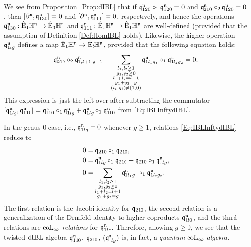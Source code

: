 \documentclass[\MainFolder/Text.tex]{subfiles}
\begin{document}
\begin{Remark}\label{Rem:Higher}
\begin{RemarkList}
\item We see from Proposition~\ref{Prop:dIBL} that if $\mathfrak{q}_{120}^{\mathfrak{n}} \circ_1 \mathfrak{q}_{120}^{\mathfrak{n}} = 0$ and $\mathfrak{q}_{210}^{\mathfrak{n}} \circ_{2} \mathfrak{q}_{120}^{\mathfrak{n}} = 0$, then $[\partial^{\mathfrak{n}}, \mathfrak{q}_{130}^{\mathfrak{n}}] = 0$ and $[\partial^{\mathfrak{n}}, \mathfrak{q}_{111}^{\mathfrak{n}}] = 0$, respectively, and hence the operations $\mathfrak{q}_{130}^{\mathfrak{n}}: \hat{\mathrm{E}}_1\mathbb{H}^{\mathfrak{n}}\rightarrow \hat{\mathrm{E}}_3\mathbb{H}^{\mathfrak{n}}$ and $\mathfrak{q}_{111}^{\mathfrak{n}}: \hat{\mathrm{E}}_1\mathbb{H}^{\mathfrak{n}}\rightarrow \hat{\mathrm{E}}_1\mathbb{H}^{\mathfrak{n}}$ are well-defined (provided that the assumption of Definition \ref{Def:HomIBL} holds). Likewise, the higher operation~$\mathfrak{q}_{1lg}^{\mathfrak{n}}$ defines a map $\hat{\mathrm{E}}_1\mathbb{H}^{\mathfrak{n}} \rightarrow \hat{\mathrm{E}}_l\mathbb{H}^{\mathfrak{n}}$, provided that the following equation holds:
\[ \mathfrak{q}^{\mathfrak{n}}_{210}\circ_2 \mathfrak{q}_{1,l+1,g-1}^{\mathfrak{n}} + \sum_{\substack{l_1, l_2 \ge 1 \\ g_1, g_2 \ge 0 \\ l_1 + l_2 = l+1 \\ g_1 + g_2 = g \\ (l_i,g_i)\neq (1,0)}} \mathfrak{q}^{\mathfrak{n}}_{1l_1 g_1}\circ_1 \mathfrak{q}^{\mathfrak{n}}_{1 l_2 g_2} = 0. \]
This expression is just the left-over after subtracting the commutator $[\mathfrak{q}_{1lg}^{\mathfrak{n}},\mathfrak{q}_{110}^{\mathfrak{n}}] = \mathfrak{q}_{110}^{\mathfrak{n}} \circ_1 \mathfrak{q}_{1lg}^{\mathfrak{n}} + \mathfrak{q}_{1lg}^{\mathfrak{n}} \circ_1 \mathfrak{q}_{110}^{\mathfrak{n}}$ from \eqref{Eq:IBLInftydIBL}.
\item In the genus-$0$ case, i.e., $\mathfrak{q}_{1lg}^{\mathfrak{n}} = 0$ whenever $g\ge 1$, relations \eqref{Eq:IBLInftydIBL} reduce to
\begin{align*}
 0 & = \mathfrak{q}_{210}\circ_1\mathfrak{q}_{210}, \\
 0 & = \mathfrak{q}_{1lg}^{\mathfrak{n}}\circ_1\mathfrak{q}_{210} + \mathfrak{q}_{210}\circ_1\mathfrak{q}_{1lg}^{\mathfrak{n}}, \\
 0 & = \sum_{\substack{l_1,l_2\ge 1\\ g_1, g_2 \ge 0 \\ l_1 + l_2 = l + 1 \\ g_1 + g_2 = g}} \mathfrak{q}_{1l_1 g_1}^{\mathfrak{n}} \circ_1 \mathfrak{q}_{1l_2 g_2}^{\mathfrak{n}}.
\end{align*}
The first relation is the Jacobi identity for $\mathfrak{q}_{210}$, the second relation is a generalization of the Drinfeld identity to higher coproducts $\mathfrak{q}_{1l0}^{\mathfrak{n}}$, and the third relations are \emph{$\mathrm{coL}_\infty$-relations} for $\mathfrak{q}_{1lg}^{\mathfrak{n}}$.
Therefore, allowing $g\ge 0$, we see that the twisted $\mathrm{dIBL}$-algebra $\mathfrak{q}_{110}^{\mathfrak{n}}$, $\mathfrak{q}_{210}$, $(\mathfrak{q}_{1lg}^{\mathfrak{n}})$ is, in fact, a \emph{quantum $\mathrm{coL}_\infty$-algebra.}\qedhere
\end{RemarkList}
\end{Remark}
\end{document}
